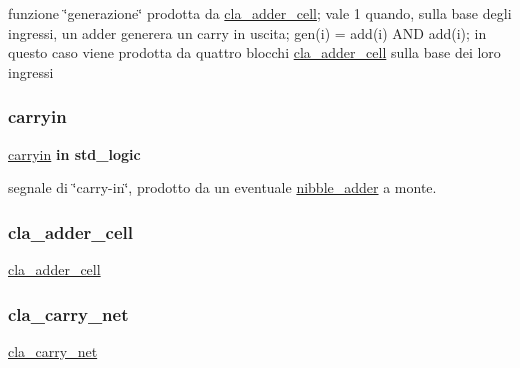 funzione \char`\"{}generazione\char`\"{} prodotta da \hyperlink{classcla__adder__cell}{cla\+\_\+adder\+\_\+cell}; vale 1 quando, sulla base degli ingressi, un adder generera\textquotesingle{} un carry in uscita; gen(i) = add(i) A\+ND add(i); in questo caso viene prodotta da quattro blocchi \hyperlink{classcla__adder__cell}{cla\+\_\+adder\+\_\+cell} sulla base dei loro ingressi \mbox{\label{group___nibble_adder_gaa556a73dc4a4de1a0d662b25adbcbe33}} 
\subsubsection{\texorpdfstring{carryin}{carryin}}
{\footnotesize\ttfamily \hyperlink{group___nibble_adder_gaa556a73dc4a4de1a0d662b25adbcbe33}{carryin} {\bfseries \textcolor{vhdlchar}{in}\textcolor{vhdlchar}{ }} {\bfseries \textcolor{vhdlchar}{std\+\_\+logic}\textcolor{vhdlchar}{ }} \hspace{0.3cm}{\ttfamily [Port]}}



segnale di \char`\"{}carry-\/in\char`\"{}, prodotto da un eventuale \hyperlink{classnibble__adder}{nibble\+\_\+adder} a monte. 

\mbox{\label{group___nibble_adder_ga4f13eb52457f650b1d2cd352d9cacca9}} 
\subsubsection{\texorpdfstring{cla\+\_\+adder\+\_\+cell}{cla\_adder\_cell}}
{\footnotesize\ttfamily \hyperlink{group___nibble_adder_ga4f13eb52457f650b1d2cd352d9cacca9}{cla\+\_\+adder\+\_\+cell} {\bfseries \textcolor{vhdlchar}{ }} \hspace{0.3cm}{\ttfamily [Component]}}

\mbox{\label{group___nibble_adder_ga12bdc5892f526938e1447d663d152df8}} 
\subsubsection{\texorpdfstring{cla\+\_\+carry\+\_\+net}{cla\_carry\_net}}
{\footnotesize\ttfamily \hyperlink{group___nibble_adder_ga12bdc5892f526938e1447d663d152df8}{cla\+\_\+carry\+\_\+net} {\bfseries \textcolor{vhdlchar}{ }} \hspace{0.3cm}{\ttfamily [Component]}}

